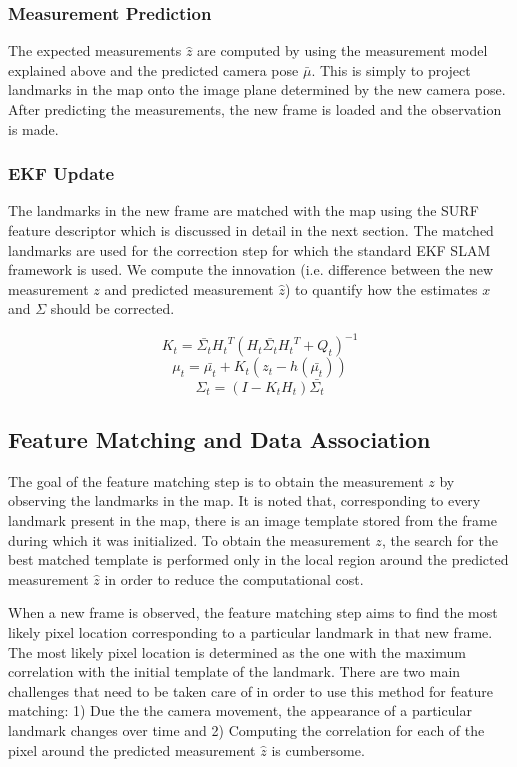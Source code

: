 \documentclass[conference]{IEEEtran}
\begin{document}
\subsubsection{Measurement Prediction}
The expected measurements $\hat{z}$ are computed by using the measurement model explained above and the predicted camera pose $\bar{\mu}$. This is simply to project landmarks in the map onto the image plane determined by the new camera pose. After predicting the measurements, the new frame is loaded and the observation is made.

\subsubsection{EKF Update}
The landmarks in the new frame are matched with the map using the SURF feature descriptor which is discussed in detail in the next section. The matched landmarks are used for the correction step for which the standard EKF SLAM framework is used. We compute the innovation (i.e. difference between the new measurement $z$ and predicted measurement $\hat{z}$) to quantify how the estimates $x$ and $\Sigma$ should be corrected. 

\begin{equation}
K_{t} = \bar{\Sigma_{t}}{H_{t}}^{T}(H_{t}\bar{\Sigma_{t}}{H_{t}}^{T} + Q_{t})^{-1}
\end{equation}
\begin{equation}
\mu_{t} = \bar{\mu_{t}} + K_{t}(z_{t} - h(\bar{\mu_t{}}))
\end{equation}
\begin{equation}
\Sigma_{t} = (I - K_{t}H_{t})\bar{\Sigma_{t}}
\end{equation}

\subsection{Feature Matching and Data Association}
The goal of the feature matching step is to obtain the measurement $z$ by observing the landmarks in the map. It is noted that, corresponding to every landmark present in the map, there is an image template stored from the frame during which it was initialized. To obtain the measurement $z$, the search for the best matched template is performed only in the local region around the predicted measurement $\hat{z}$ in order to reduce the computational cost.

When a new frame is observed, the feature matching step aims to find the most likely pixel location corresponding to a particular landmark in that new frame. The most likely pixel location is determined as the one with the maximum correlation with the initial template of the landmark. There are two main challenges that need to be taken care of in order to use this method for feature matching: 1) Due the the camera movement, the appearance of a particular landmark changes over time and 2) Computing the correlation for each of the pixel around the predicted measurement $\hat{z}$ is cumbersome. 
\end{document}
